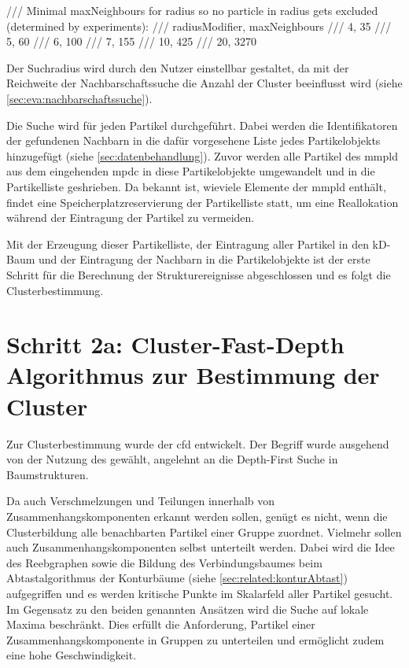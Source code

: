	/// Minimal maxNeighbours for radius so no particle in radius gets excluded (determined by experiments):
	/// radiusModifier, maxNeighbours
	/// 4, 35
	/// 5, 60
	/// 6, 100
	/// 7, 155
	/// 10, 425
	/// 20, 3270

Der Suchradius wird durch den Nutzer einstellbar gestaltet, da mit der Reichweite der Nachbarschaftssuche die Anzahl der Cluster beeinflusst wird (siehe \autoref{sec:eva:nachbarschaftssuche}).

Die Suche wird für jeden Partikel durchgeführt. Dabei werden die Identifikatoren der gefundenen Nachbarn in die dafür vorgesehene Liste jedes Partikelobjekts hinzugefügt (siehe \autoref{sec:datenbehandlung}). Zuvor werden alle Partikel des \gls{mmpld} aus dem eingehenden \gls{mpdc} in diese Partikelobjekte umgewandelt und in die Partikelliste geshrieben. Da bekannt ist, wieviele Elemente der \gls{mmpld} enthält, findet eine Speicherplatzreservierung der Partikelliste statt, um eine Reallokation während der Eintragung der Partikel zu vermeiden.

Mit der Erzeugung dieser Partikelliste, der Eintragung aller Partikel in den kD-Baum und der Eintragung der Nachbarn in die Partikelobjekte ist der erste Schritt für die Berechnung der Strukturereignisse abgeschlossen und es folgt die Clusterbestimmung.

\section{Schritt 2a: Cluster-Fast-Depth Algorithmus zur Bestimmung der Cluster}\label{sec:fast-depth}

Zur Clusterbestimmung wurde der \gls{cfd} entwickelt. Der Begriff wurde ausgehend von der Nutzung des  gewählt, angelehnt an die Depth-First Suche in Baumstrukturen.

Da auch Verschmelzungen und Teilungen innerhalb von Zusammenhangskomponenten erkannt werden sollen, genügt es nicht, wenn die Clusterbildung alle benachbarten Partikel einer Gruppe zuordnet. Vielmehr sollen auch Zusammenhangskomponenten selbst unterteilt werden.
Dabei wird die Idee des Reebgraphen sowie die Bildung des Verbindungsbaumes beim Abtastalgorithmus der Konturbäume (siehe \autoref{sec:related:konturAbtast}) aufgegriffen und es werden kritische Punkte im Skalarfeld aller Partikel gesucht. Im Gegensatz zu den beiden genannten Ansätzen wird die Suche auf lokale Maxima beschränkt. Dies erfüllt die Anforderung, Partikel einer Zusammenhangskomponente in Gruppen zu unterteilen und ermöglicht zudem eine hohe Geschwindigkeit.


